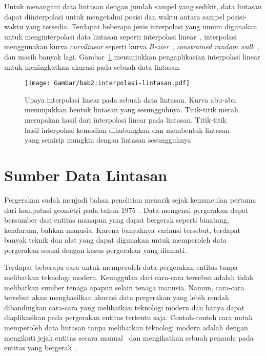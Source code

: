 Untuk menangani data lintasan dengan jumlah sampel yang sedikit, data lintasan dapat diinterpolasi untuk mengetahui posisi dan waktu antara sampel posisi-waktu yang tersedia. Terdapat beberapa jenis interpolasi yang umum digunakan untuk menginterpolasi data lintasan seperti interpolasi linear~\cite{wiratma:trajectory}, interpolasi menggunakan kurva \textit{curvilinear} seperti kurva \textit{Bezier}~\cite{tremblay:02:curvilinear}, \textit{constrained random walk}~\cite{wentz:02:constrained-random-walk}, dan masih banyak lagi. Gambar~\ref{bab2:interpolasi-lintasan} menunjukkan pengaplikasian interpolasi linear untuk meningkatkan akurasi pada sebuah data lintasan.

\begin{figure}[htbp]
    \centering
    \captionsetup{width=0.7\textwidth}
    \texttt{[image: Gambar/bab2:interpolasi-lintasan.pdf]}
    \caption[Interpolasi lintasan]{Upaya interpolasi linear pada sebuah data lintasan. Kurva abu-abu menunjukkan bentuk lintasan yang sesungguhnya. Titik-titik merah merupakan hasil dari interpolasi linear pada lintasan. Titik-titik hasil interpolasi kemudian dihubungkan dan membentuk lintasan yang semirip mungkin dengan lintasan sesungguhnya}
    \label{bab2:interpolasi-lintasan}
\end{figure}

\section{Sumber Data Lintasan}
\label{sec:sumber}

Pergerakan sudah menjadi bahan penelitian menarik sejak kemunculan pertama dari komputasi geometri pada tahun 1975~\cite{shamos:02:computational-geometry}. Data mengenai pergerakan dapat bersumber dari entitas manapun yang dapat bergerak seperti binatang, kendaraan, bahkan manusia. Karena banyaknya variansi tersebut, terdapat banyak teknik dan alat yang dapat digunakan untuk memperoleh data pergerakan sesuai dengan kasus pergerakan yang diamati.

Terdapat beberapa cara untuk memperoleh data pergerakan entitas tanpa melibatkan teknologi modern. Keunggulan dari cara-cara tersebut adalah tidak melibatkan sumber tenaga apapun selain tenaga manusia. Namun, cara-cara tersebut akan menghasilkan akurasi data pergerakan yang lebih rendah dibandingkan cara-cara yang melibatkan teknologi modern dan hanya dapat diaplikasikan pada pergerakan entitas tertentu saja. Contoh-contoh cara untuk memperoleh data lintasan tanpa melibatkan teknologi modern adalah dengan mengikuti jejak entitas secara manual~\cite{stickel:02:turtle} dan mengikatkan sebuah penanda pada entitas yang bergerak~\cite{velden:02:cranes}.

